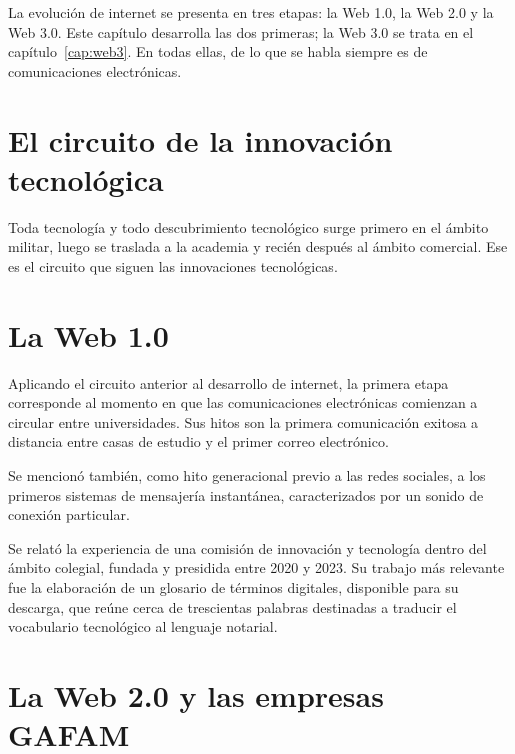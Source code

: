 \documentclass[12pt,oneside]{book}
\begin{document}
La evolución de internet se presenta en tres etapas: la Web 1.0, la Web 2.0 y la Web 3.0. Este capítulo desarrolla las dos primeras; la Web 3.0 se trata en el capítulo~\ref{cap:web3}. En todas ellas, de lo que se habla siempre es de comunicaciones electrónicas.

\section{El circuito de la innovación tecnológica}

\begin{important}
Toda tecnología y todo descubrimiento tecnológico surge primero en el ámbito militar, luego se traslada a la academia y recién después al ámbito comercial. Ese es el circuito que siguen las innovaciones tecnológicas.
\end{important}

\section{La Web 1.0}

Aplicando el circuito anterior al desarrollo de internet, la primera etapa corresponde al momento en que las comunicaciones electrónicas comienzan a circular entre universidades. Sus hitos son la primera comunicación exitosa a distancia entre casas de estudio y el primer correo electrónico.


Se mencionó también, como hito generacional previo a las redes sociales, a los primeros sistemas de mensajería instantánea, caracterizados por un sonido de conexión particular.

\begin{note}
Se relató la experiencia de una comisión de innovación y tecnología dentro del ámbito colegial, fundada y presidida entre 2020 y 2023. Su trabajo más relevante fue la elaboración de un glosario de términos digitales, disponible para su descarga, que reúne cerca de trescientas palabras destinadas a traducir el vocabulario tecnológico al lenguaje notarial.
\end{note}

\section{La Web 2.0 y las empresas GAFAM}
\end{document}
